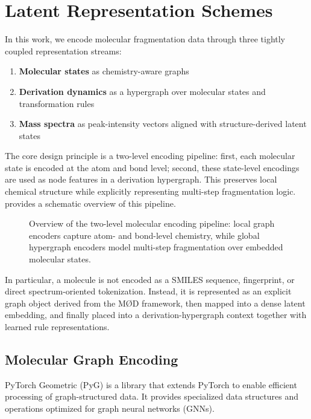 \section{Latent Representation Schemes}

In this work, we encode molecular fragmentation data through three tightly coupled representation streams:

\begin{enumerate}
    \item \textbf{Molecular states} as chemistry-aware graphs
    \item \textbf{Derivation dynamics} as a hypergraph over molecular states and transformation rules
    \item \textbf{Mass spectra} as peak-intensity vectors aligned with structure-derived latent states
\end{enumerate}

The core design principle is a two-level encoding pipeline:
first, each molecular state is encoded at the atom and bond level;
second, these state-level encodings are used as node features in a derivation hypergraph.
This preserves local chemical structure while explicitly representing multi-step fragmentation logic.
 provides a schematic overview of this pipeline.

\begin{figure}[H]
    \centering
    \resizebox{0.9\textwidth}{!}{
        
    }
    \caption[Overview of the Two-Level Representation]{
        Overview of the two-level molecular encoding pipeline: local graph encoders capture atom- and bond-level chemistry, while global hypergraph encoders model multi-step fragmentation over embedded molecular states. 
    }
    \label{fig:2-level-overview}
\end{figure}

In particular, a molecule is not encoded as a SMILES sequence, fingerprint, or direct spectrum-oriented tokenization.
Instead, it is represented as an explicit graph object derived from the M\O D framework, then mapped into a dense latent embedding, and finally placed into a derivation-hypergraph context together with learned rule representations.

\subsection{Molecular Graph Encoding}
\label{sec:molgraph-encoding}

PyTorch Geometric (PyG) \cite{Fey2025} is a library that extends PyTorch to enable efficient processing of graph-structured data.
It provides specialized data structures and operations optimized for graph neural networks (GNNs).

